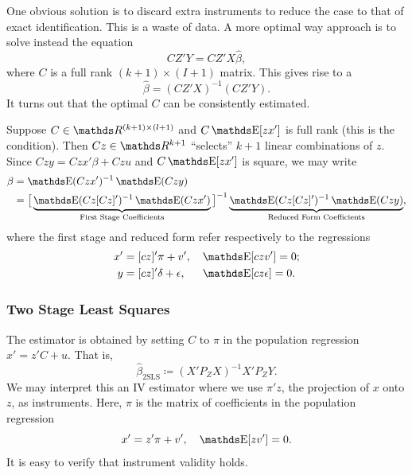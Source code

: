 \documentclass[letterpaper, 10pt]{article}
\DeclareMathOperator{\TSLS}{2SLS}
\begin{document}
One obvious solution is to discard extra instruments to reduce the case to that of exact identification.
This is a waste of data.
A more optimal way approach is to solve instead the equation
\[
  C Z' Y = C Z' X \hat{\beta},
\]
where \(C\) is a full rank \((k + 1) \times (I + 1)\) matrix.
This gives rise to a 
\[
  \hat{\beta}
  = (C Z' X)^{-1} (C Z' Y).
\]
It turns out that the optimal \(C\) can be consistently estimated.

Suppose \(C \in \RR^{(k + 1) \times (l + 1)}\) and \(C \E[zx']\) is full rank (this is the  condition).
Then \(Cz \in \RR^{k + 1}\) ``selects'' \(k + 1\) linear combinations of \(z\).
Since \(Czy = Czx' \beta + Czu\) and \(C \E[zx']\) is square, we may write
\begin{align*}
  \beta
  &= \E(Czx')^{-1} \E(Czy) \\
  &= \big[ \underbrace{\E(Cz[Cz]')^{-1} \E(Czx')}_{\mathclap{\text{First Stage Coefficients}}} \big]^{-1}
  \underbrace{\E(Cz[Cz]')^{-1} \E(Czy)}_{\mathclap{\text{Reduced Form Coefficients}}},
\end{align*}
where the first stage and reduced form refer respectively to the regressions
\begin{align*}
  x' &= [cz]' \pi + v', &&
  \E[czv'] = 0; \\
  y &= [cz]' \delta + \epsilon, &&
  \E[cz\epsilon] = 0.
\end{align*}

\subsubsection{Two Stage Least Squares}
The  estimator is obtained by setting \(C\) to \(\pi\) in the population regression \(x' = z' C + u\).
That is,
\[
  \hat{\beta}_{\TSLS}
  \coloneqq (X' P_Z X)^{-1} X' P_Z Y.
\]
We may interpret this an IV estimator where we use \(\pi' z\), the projection of \(x\) onto \(z\), as instruments.
Here, \(\pi\) is the matrix of coefficients in the population regression
\[
  x' = z' \pi + v', \quad \E[zv'] = 0.
\]
It is easy to verify that instrument validity holds.
\end{document}

